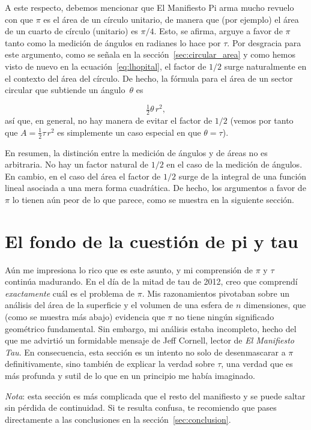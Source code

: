 A este respecto, debemos mencionar que El Manifiesto Pi arma mucho revuelo con que $\pi$ es el área de un círculo unitario, de manera que (por ejemplo) el área de un cuarto de círculo (unitario) es $\pi/4$. Esto, se afirma, arguye a favor de $\pi$ tanto como la medición de ángulos en radianes lo hace por $\tau$. Por desgracia para este argumento, como se señala en la sección~\ref{sec:circular_area} y como hemos visto de nuevo en la ecuación~\eqref{eq:lhopital}, el factor de $1/2$ surge naturalmente en el contexto del área del círculo. De hecho, la fórmula para el área de un sector circular que subtiende un ángulo~$\theta$ es

\[
\tfrac{1}{2}\theta\, r^2,
\]
así que, en general, no hay manera de evitar el factor de $1/2$ (vemos por tanto que $A = \frac{1}{2} \tau\, r^2$ es simplemente un caso especial en que  $\theta = \tau$).

En resumen, la distinción entre la medición de ángulos y de áreas no es arbitraria. No hay un factor natural de $1/2$ en el caso de la medición de ángulos. En cambio, en el caso del área el factor de $1/2$ surge de la integral de una función lineal asociada a una mera forma cuadrática. De hecho, los argumentos a favor de $\pi$ lo tienen aún peor de lo que parece, como se muestra en la siguiente sección.


\section{El fondo de la cuestión de pi y tau} %
\label{sec:getting_to_the_bottom_of_pi}

Aún me impresiona lo rico que es este asunto, y mi comprensión de $\pi$ y $\tau$ continúa madurando. En el día de la mitad de tau de 2012, creo que comprendí \emph{exactamente} cuál es el problema de $\pi$. Mis razonamientos pivotaban sobre un análisis del área de la superficie y el volumen de una esfera de $n$ dimensiones, que (como se muestra más abajo) evidencia que $\pi$ no tiene ningún significado geométrico fundamental. Sin embargo, mi análisis estaba incompleto, hecho del que me advirtió un formidable mensaje de Jeff Cornell, lector de \emph{El Manifiesto Tau}. En consecuencia, esta sección es un intento no solo de desenmascarar a $\pi$ definitivamente, sino también de explicar la verdad sobre $\tau$, una verdad que es más profunda y sutil de lo que en un principio me había imaginado.

\emph{Nota}: esta sección es más complicada que el resto del manifiesto y se puede saltar sin pérdida de continuidad. Si te resulta confusa, te recomiendo que pases directamente a las conclusiones en la sección~\ref{sec:conclusion}.

